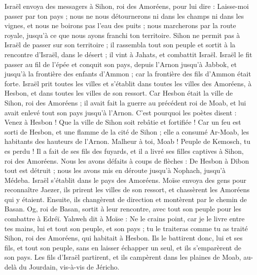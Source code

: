 \begin{multicols}{2}
Israël envoya des messagers à Sihon, roi des Amoréens, pour lui dire :
Laisse-moi passer par ton pays ; nous ne nous détournerons ni dans les champs ni dans les vignes, et nous ne boirons pas l'eau des puits ; nous marcherons par la route royale, jusqu'à ce que nous ayons franchi ton territoire.
Sihon ne permit pas à Israël de passer sur son territoire ; il rassembla tout son peuple et sortit à la rencontre d'Israël, dans le désert ; il vint à Jahats, et combattit Israël.
Israël le fit passer au fil de l'épée et conquit son pays, depuis l'Arnon jusqu'à Jabbok, et jusqu'à la frontière des enfants d'Ammon ; car la frontière des fils d'Ammon était forte.
Israël prit toutes les villes et s'établit dans toutes les villes des Amoréens, à Hesbon, et dans toutes les villes de son ressort.
Car Hesbon était la ville de Sihon, roi des Amoréens ; il avait fait la guerre au précédent roi de Moab, et lui avait enlevé tout son pays jusqu'à l'Arnon.
C'est pourquoi les poètes disent : Venez à Hesbon ! Que la ville de Sihon soit rebâtie et fortifiée !
Car un feu est sorti de Hesbon, et une flamme de la cité de Sihon ; elle a consumé Ar-Moab, les habitants des hauteurs de l'Arnon.
Malheur à toi, Moab ! Peuple de Kemosch, tu es perdu ! Il a fait de ses fils des fuyards, et il a livré ses filles captives à Sihon, roi des Amoréens.
Nous les avons défaits à coups de flèches : De Hesbon à Dibon tout est détruit ; nous les avons mis en déroute jusqu'à Nophach, jusqu'à Médeba.
Israël s'établit dans le pays des Amoréens.
Moïse envoya des gens pour reconnaître Jaezer, ils prirent les villes de son ressort, et chassèrent les Amoréens qui y étaient.
Ensuite, ils changèrent de direction et montèrent par le chemin de Basan. Og, roi de Basan, sortit à leur rencontre, avec tout son peuple pour les combattre à Edréï.
Yahweh dit à Moïse : Ne le crains point, car je le livre entre tes mains, lui et tout son peuple, et son pays ; tu le traiteras comme tu as traité Sihon, roi des Amoréens, qui habitait à Hesbon.
Ils le battirent donc, lui et ses fils, et tout son peuple, sans en laisser échapper un seul, et ils s'emparèrent de son pays.
\VerseOne{}Les fils d'Israël partirent, et ils campèrent dans les plaines de Moab, au-delà du Jourdain, vis-à-vis de Jéricho.

\end{multicols}
